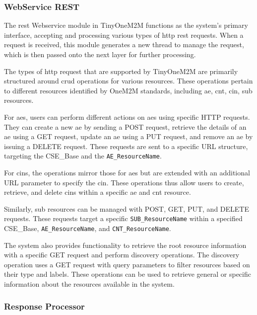 \documentclass[a4paper,fleqn]{cas-dc}
\begin{document}
\subsubsection{WebService REST}\label{sec:archwebservice}

The \gls{rest} Webservice module in TinyOneM2M functions as the system's primary interface, accepting and processing various types of \gls{http} \gls{rest} requests. When a request is received, this module generates a new thread to manage the request, which is then passed onto the next layer for further processing.

The types of \gls{http} request that are supported by TinyOneM2M are primarily structured around \gls{crud} operations for various resources. These operations pertain to different resources identified by OneM2M standards, including \gls{ae}, \gls{cnt}, \gls{cin}, \gls{sub} resources.

For \gls{aes}, users can perform different actions on \glspl{ae} using specific HTTP requests. They can create a new \gls{ae} by sending a POST request, retrieve the details of an \gls{ae} using a GET request, update an \gls{ae} using a PUT request, and remove an \gls{ae} by issuing a DELETE request. These requests are sent to a specific URL structure, targeting the CSE\_Base and the \texttt{AE\_ResourceName}.

For \gls{cins}, the operations mirror those for \gls{aes} but are extended with an additional URL parameter to specify the \gls{cin}. These operations thus allow users to create, retrieve, and delete \gls{cins} within a specific \gls{ae} and \gls{cnt} resource.

Similarly, \gls{sub} resources can be managed with POST, GET, PUT, and DELETE requests. These requests target a specific \texttt{SUB\_ResourceName} within a specified CSE\_Base, \texttt{AE\_ResourceName}, and \texttt{CNT\_ResourceName}.

The system also provides functionality to retrieve the root resource information with a specific GET request and perform discovery operations. The discovery operation uses a GET request with query parameters to filter resources based on their type and labels. These operations can be used to retrieve general or specific information about the resources available in the system.

\subsubsection{Response Processor} \label{sec:archresponseprocessor}
\end{document}

